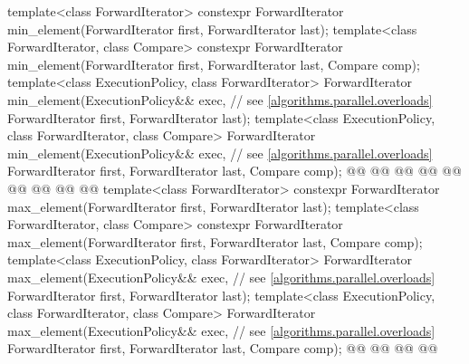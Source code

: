 \begin{codeblock}
{  template<class ForwardIterator>
    constexpr ForwardIterator min_element(ForwardIterator first, ForwardIterator last);
  template<class ForwardIterator, class Compare>
    constexpr ForwardIterator min_element(ForwardIterator first, ForwardIterator last,
                                          Compare comp);
  template<class ExecutionPolicy, class ForwardIterator>
    ForwardIterator min_element(ExecutionPolicy&& exec, // see \ref{algorithms.parallel.overloads}
                                ForwardIterator first, ForwardIterator last);
  template<class ExecutionPolicy, class ForwardIterator, class Compare>
    ForwardIterator min_element(ExecutionPolicy&& exec, // see \ref{algorithms.parallel.overloads}
                                ForwardIterator first, ForwardIterator last,
                                Compare comp);
  @@
    @@
        @@
      @@
    @@
        @@
      @@
        @@
  @\added{\}}@
  template<class ForwardIterator>
    constexpr ForwardIterator max_element(ForwardIterator first, ForwardIterator last);
  template<class ForwardIterator, class Compare>
    constexpr ForwardIterator max_element(ForwardIterator first, ForwardIterator last,
                                          Compare comp);
  template<class ExecutionPolicy, class ForwardIterator>
    ForwardIterator max_element(ExecutionPolicy&& exec, // see \ref{algorithms.parallel.overloads}
                                ForwardIterator first, ForwardIterator last);
  template<class ExecutionPolicy, class ForwardIterator, class Compare>
    ForwardIterator max_element(ExecutionPolicy&& exec, // see \ref{algorithms.parallel.overloads}
                                ForwardIterator first, ForwardIterator last,
                                Compare comp);
  @@
    @@
        @@
      @@
}
\end{codeblock}
